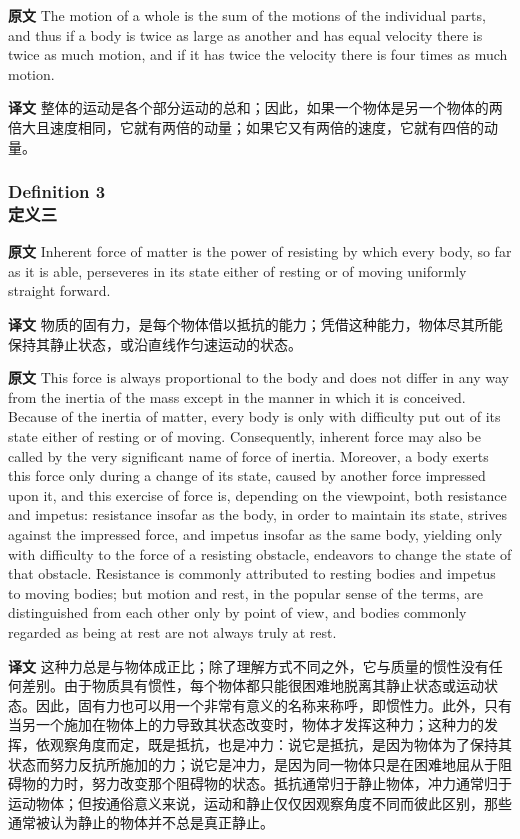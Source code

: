 \documentclass[UTF8,zihao=-4]{ctexart}
\begin{document}
\noindent\textbf{原文} The motion of a whole is the sum of the motions of the individual parts, and thus if a body is twice as large as another and has equal velocity there is twice as much motion, and if it has twice the velocity there is four times as much motion.
\par\noindent\textbf{译文} 整体的运动是各个部分运动的总和；因此，如果一个物体是另一个物体的两倍大且速度相同，它就有两倍的动量；如果它又有两倍的速度，它就有四倍的动量。
\medskip

\subsubsection*{Definition 3\\定义三}
\noindent\textbf{原文} Inherent force of matter is the power of resisting by which every body, so far as it is able, perseveres in its state either of resting or of moving uniformly straight forward.
\par\noindent\textbf{译文} 物质的固有力，是每个物体借以抵抗的能力；凭借这种能力，物体尽其所能保持其静止状态，或沿直线作匀速运动的状态。
\medskip

\noindent\textbf{原文} This force is always proportional to the body and does not differ in any way from the inertia of the mass except in the manner in which it is conceived. Because of the inertia of matter, every body is only with difficulty put out of its state either of resting or of moving. Consequently, inherent force may also be called by the very significant name of force of inertia. Moreover, a body exerts this force only during a change of its state, caused by another force impressed upon it, and this exercise of force is, depending on the viewpoint, both resistance and impetus: resistance insofar as the body, in order to maintain its state, strives against the impressed force, and impetus insofar as the same body, yielding only with difficulty to the force of a resisting obstacle, endeavors to change the state of that obstacle. Resistance is commonly attributed to resting bodies and impetus to moving bodies; but motion and rest, in the popular sense of the terms, are distinguished from each other only by point of view, and bodies commonly regarded as being at rest are not always truly at rest.
\par\noindent\textbf{译文} 这种力总是与物体成正比；除了理解方式不同之外，它与质量的惯性没有任何差别。由于物质具有惯性，每个物体都只能很困难地脱离其静止状态或运动状态。因此，固有力也可以用一个非常有意义的名称来称呼，即惯性力。此外，只有当另一个施加在物体上的力导致其状态改变时，物体才发挥这种力；这种力的发挥，依观察角度而定，既是抵抗，也是冲力：说它是抵抗，是因为物体为了保持其状态而努力反抗所施加的力；说它是冲力，是因为同一物体只是在困难地屈从于阻碍物的力时，努力改变那个阻碍物的状态。抵抗通常归于静止物体，冲力通常归于运动物体；但按通俗意义来说，运动和静止仅仅因观察角度不同而彼此区别，那些通常被认为静止的物体并不总是真正静止。
\medskip
\end{document}
